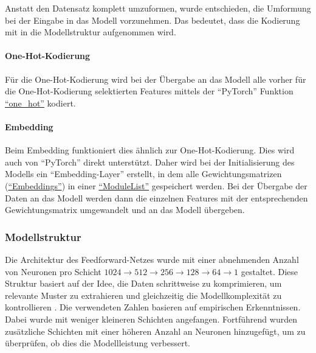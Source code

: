 Anstatt den Datensatz komplett umzuformen, wurde entschieden, die Umformung bei der Eingabe in das Modell vorzunehmen. Das bedeutet, dass die Kodierung mit in die Modellstruktur aufgenommen wird.

\paragraph{One-Hot-Kodierung}
Für die One-Hot-Kodierung wird bei der Übergabe an das Modell alle vorher für die One-Hot-Kodierung selektierten Features mittels der \enquote{PyTorch} Funktion \href{https://pytorch.org/docs/stable/generated/torch.nn.functional.one_hot.html}{\enquote{one\_hot}} kodiert. 

\paragraph{Embedding}
Beim Embedding funktioniert dies ähnlich zur One-Hot-Kodierung. 
Dies wird auch von \enquote{PyTorch} direkt unterstützt. 
Daher wird bei der Initialisierung des Modells ein \enquote{Embedding-Layer} erstellt, in dem alle Gewichtungsmatrizen (\href{https://pytorch.org/docs/stable/generated/torch.nn.Embedding.html}{\enquote{Embeddings}}) in einer \href{https://pytorch.org/docs/stable/generated/torch.nn.ModuleList.html}{\enquote{ModuleList}} gespeichert werden.
Bei der Übergabe der Daten an das Modell werden dann die einzelnen Features mit der entsprechenden Gewichtungsmatrix umgewandelt und an das Modell übergeben.



\subsubsection{Modellstruktur}
%


Die Architektur des Feedforward-Netzes wurde mit einer abnehmenden Anzahl von Neuronen pro Schicht $1024 \rightarrow 512 \rightarrow 256 \rightarrow 128 \rightarrow 64 \rightarrow 1$ gestaltet. 
Diese Struktur basiert auf der Idee, die Daten schrittweise zu komprimieren, um relevante Muster zu extrahieren und gleichzeitig die Modellkomplexität zu kontrollieren \cite{Goodfellow2016}. 
Die verwendeten Zahlen basieren auf empirischen Erkenntnissen. 
Dabei wurde mit weniger kleineren Schichten angefangen. 
Fortführend wurden zusätzliche Schichten mit einer höheren Anzahl an Neuronen hinzugefügt, um zu überprüfen, ob dies die Modellleistung verbessert.

